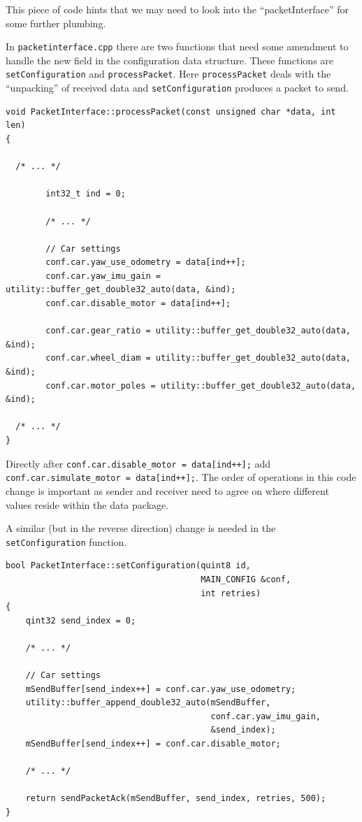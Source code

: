 \documentclass[12pt]{article} %
\newcommand{\change}[0]{\noindent{\hl {\b CODE CHANGE:}}}
\begin{document}
This piece of code hints that we may need to look into the ``packetInterface''
for some further plumbing.

In {\verb!packetinterface.cpp!} there are two functions that need some
amendment to handle the new field in the configuration
data structure. These functions are {\verb!setConfiguration!} and
{\verb!processPacket!}. Here {\verb!processPacket!} deals with the
  ``unpacking'' of received data and {\verb!setConfiguration!}
  produces a packet to send.


\begin{Verbatim}[samepage=true,frame=single,label=Linux/RControlStation/packetinterface.cpp]
void PacketInterface::processPacket(const unsigned char *data, int len)
{
   
  /* ... */
  
        int32_t ind = 0;

        /* ... */
        
        // Car settings
        conf.car.yaw_use_odometry = data[ind++];
        conf.car.yaw_imu_gain = utility::buffer_get_double32_auto(data, &ind);
        conf.car.disable_motor = data[ind++];

        conf.car.gear_ratio = utility::buffer_get_double32_auto(data, &ind);
        conf.car.wheel_diam = utility::buffer_get_double32_auto(data, &ind);
        conf.car.motor_poles = utility::buffer_get_double32_auto(data, &ind);
        
  /* ... */ 
}
\end{Verbatim}

\change{} Directly after
       {\verb!conf.car.disable_motor = data[ind++];!} add
       \\ {\verb!conf.car.simulate_motor = data[ind++];!}.  The order
       of operations in this code change is important as sender and
       receiver need to agree on where different values reside within
       the data package.



A similar (but in the reverse direction) change is needed in the {\verb!setConfiguration!} function.
       
\begin{Verbatim}[samepage=true,frame=single,label=Linux/RControlStation/packetinterface.cpp]
bool PacketInterface::setConfiguration(quint8 id,
                                       MAIN_CONFIG &conf,
                                       int retries)
{
    qint32 send_index = 0;

    /* ... */ 
    
    // Car settings
    mSendBuffer[send_index++] = conf.car.yaw_use_odometry;
    utility::buffer_append_double32_auto(mSendBuffer,
                                         conf.car.yaw_imu_gain,
                                         &send_index);
    mSendBuffer[send_index++] = conf.car.disable_motor;

    /* ... */
    
    return sendPacketAck(mSendBuffer, send_index, retries, 500);
}
\end{Verbatim}
\end{document}

